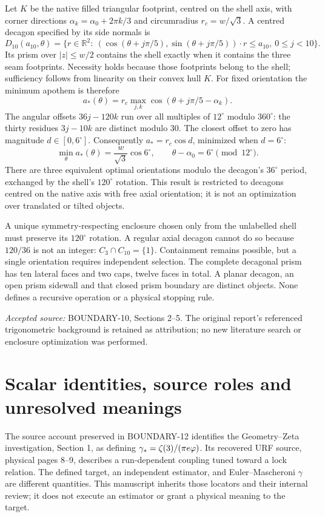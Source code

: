 \documentclass[11pt,a4paper]{article}
\newcommand{\R}{\mathbb R}\newcommand{\conv}{\operatorname{conv}}
\newcommand{\source}[1]{\par{\small\emph{Accepted source:} #1}\par}
\begin{document}
Let $K$ be the native filled triangular footprint, centred on the shell axis, with corner directions $\alpha_k=\alpha_0+2\pi k/3$ and circumradius $r_c=w/\sqrt3$. A centred decagon specified by its side normals is
\[
D_{10}(a_{10},\theta)=\{r\in\R^2:\ (\cos(\theta+j\pi/5),\sin(\theta+j\pi/5))\cdot r\leq a_{10},\ 0\leq j<10\}.
\]
Its prism over $|z|\leq w/2$ contains the shell exactly when it contains the three seam footprints. Necessity holds because those footprints belong to the shell; sufficiency follows from linearity on their convex hull $K$. For fixed orientation the minimum apothem is therefore
\begin{equation}\label{eq:apothem}
a_*(\theta)=r_c\max_{j,k}\cos(\theta+j\pi/5-\alpha_k).
\end{equation}
The angular offsets $36j-120k$ run over all multiples of $12^\circ$ modulo $360^\circ$: the thirty residues $3j-10k$ are distinct modulo 30. The closest offset to zero has magnitude $d\in[0,6^\circ]$. Consequently $a_*=r_c\cos d$, minimized when $d=6^\circ$:
\begin{equation}\label{eq:decmin}
\min_\theta a_*(\theta)=\frac w{\sqrt3}\cos6^\circ,
\qquad \theta-\alpha_0=6^\circ\pmod{12^\circ}.
\end{equation}
There are three equivalent optimal orientations modulo the decagon's $36^\circ$ period, exchanged by the shell's $120^\circ$ rotation. This result is restricted to decagons centred on the native axis with free axial orientation; it is not an optimization over translated or tilted objects.

A unique symmetry-respecting enclosure chosen only from the unlabelled shell must preserve its $120^\circ$ rotation. A regular axial decagon cannot do so because $120/36$ is not an integer: $C_3\cap C_{10}=\{1\}$. Containment remains possible, but a single orientation requires independent selection. The complete decagonal prism has ten lateral faces and two caps, twelve faces in total. A planar decagon, an open prism sidewall and that closed prism boundary are distinct objects. None defines a recursive operation or a physical stopping rule.
\source{BOUNDARY-10, Sections 2--5. The original report's referenced trigonometric background is retained as attribution; no new literature search or enclosure optimization was performed.}

\clearpage\section{Scalar identities, source roles and unresolved meanings}\label{app:scalar}
The source account preserved in BOUNDARY-12 identifies the Geometry--Zeta investigation, Section 1, as defining $\gamma_*=\zeta(3)/(\pi e\varphi)$. Its recovered URF source, physical pages 8--9, describes a run-dependent coupling tuned toward a lock relation. The defined target, an independent estimator, and Euler--Mascheroni $\gamma$ are different quantities. This manuscript inherits those locators and their internal review; it does not execute an estimator or grant a physical meaning to the target.
\end{document}
